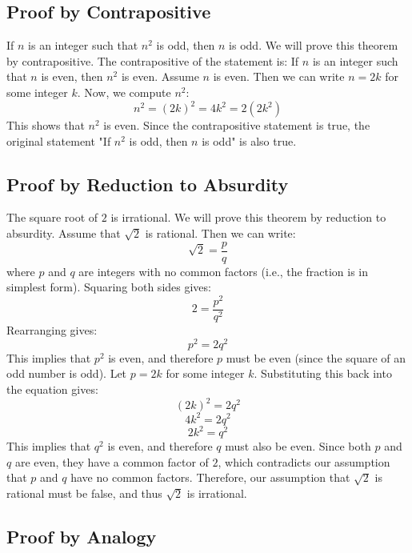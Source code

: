 \subsection{Proof by Contrapositive}

If \( n \) is an integer such that \( n^2 \) is odd, then \( n \) is odd.
\newline
	We will prove this theorem by contrapositive. The contrapositive of the statement is: If \( n \) is an integer such that \( n \) is even, then \( n^2 \) is even.
\newline
	Assume \( n \) is even. Then we can write \( n = 2k \) for some integer \( k \).
\newline
	Now, we compute \( n^2 \):
	\[
		n^2 = {(2k)}^2 = 4k^2 = 2(2k^2)
	\]
	This shows that \( n^2 \) is even.
\newline
	Since the contrapositive statement is true, the original statement "If \( n^2 \) is odd, then \( n \) is odd" is also true.
\QED

\subsection{Proof by Reduction to Absurdity}

The square root of \( 2 \) is irrational.
\newline
	We will prove this theorem by reduction to absurdity. Assume that \( \sqrt{2} \) is rational. Then we can write:
	\[
		\sqrt{2} = \frac{p}{q}
	\]
	where \( p \) and \( q \) are integers with no common factors (i.e., the fraction is in simplest form).
\newline
	Squaring both sides gives:
	\[
		2 = \frac{p^2}{q^2}
	\]
	Rearranging gives:
	\[
		p^2 = 2q^2
	\]
	This implies that \( p^2 \) is even, and therefore \( p \) must be even (since the square of an odd number is odd).
	Let \( p = 2k \) for some integer \( k \). Substituting this back into the equation gives:
	\[
		{(2k)}^2 = 2q^2
	\]
	\[
		4k^2 = 2q^2
	\]
	\[
		2k^2 = q^2
	\]
	This implies that \( q^2 \) is even, and therefore \( q \) must also be even.
	Since both \( p \) and \( q \) are even, they have a common factor of \( 2 \), which contradicts our assumption that \( p \) and \( q \) have no common factors.
	Therefore, our assumption that \( \sqrt{2} \) is rational must be false, and thus \( \sqrt{2} \) is irrational.

\QED

\subsection{Proof by Analogy}

